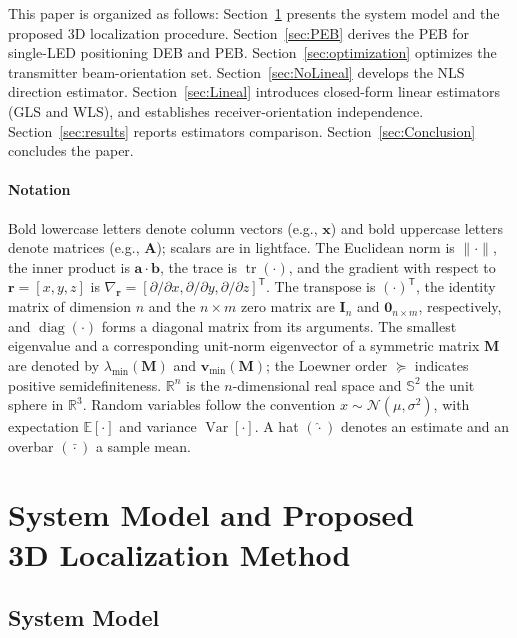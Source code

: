 \documentclass[journal]{IEEEtran}
\newcommand{\added}[1]{{\color{blue}#1}}
\newcommand{\deleted}[1]{{\color{red}#1}}
\begin{document}
This paper is organized as follows:
Section~\ref{sec:SystemModel} presents the system model and the proposed 3D localization procedure.
Section~\ref{sec:PEB} derives the \deleted{PEB for single-LED positioning} \added{DEB and PEB}.
Section~\ref{sec:optimization} optimizes the transmitter beam-orientation set.
Section~\ref{sec:NoLineal} develops the NLS direction estimator.
Section~\ref{sec:Lineal} introduces closed-form linear estimators (GLS and WLS)\added{, and establishes receiver-orientation independence}.
Section~\ref{sec:results} reports estimators comparison.
Section~\ref{sec:Conclusion} concludes the paper.

\paragraph*{Notation}
Bold lowercase letters denote column vectors (e.g., $\mathbf x$) and bold uppercase letters denote matrices (e.g., $\mathbf A$); scalars are in lightface. The Euclidean norm is $\lVert\cdot\rVert$, the inner product is $\mathbf a\!\cdot\!\mathbf b$, the trace is $\operatorname{tr}(\cdot)$, and the gradient with respect to $\mathbf{r}=[x,y,z]$ is $\nabla_{\mathbf r}=[\partial/\partial x,\partial/\partial y,\partial/\partial z]^{\mathsf T}$. The transpose is $(\cdot)^{\mathsf T}$, 
the identity matrix of dimension $n$ and the $n\times m$ zero matrix are $\mathbf{I}_n$ and $\mathbf{0}_{n\times m}$, respectively, and $\operatorname{diag}(\cdot)$ forms a diagonal matrix from its arguments. The smallest eigenvalue and a corresponding unit‐norm eigenvector of a symmetric matrix $\mathbf M$ are denoted by $\lambda_{\min}(\mathbf M)$ and $\mathbf v_{\min}(\mathbf M)$; the Loewner order $\succeq$ indicates positive semidefiniteness. $\mathbb R^n$ is the $n$-dimensional real space and $\mathbb S^{2}$ the unit sphere in $\mathbb R^{3}$. Random variables follow the convention $x\sim\mathcal N(\mu,\sigma^{2})$, with expectation $\mathbb E[\cdot]$ and variance $\operatorname{Var}[\cdot]$. A hat $(\hat{\cdot})$ denotes an estimate and an overbar $(\bar{\cdot})$ a sample mean. 

 
\section{System Model and Proposed \\3D Localization Method}
\label{sec:SystemModel}
\subsection{System Model}
\end{document}
